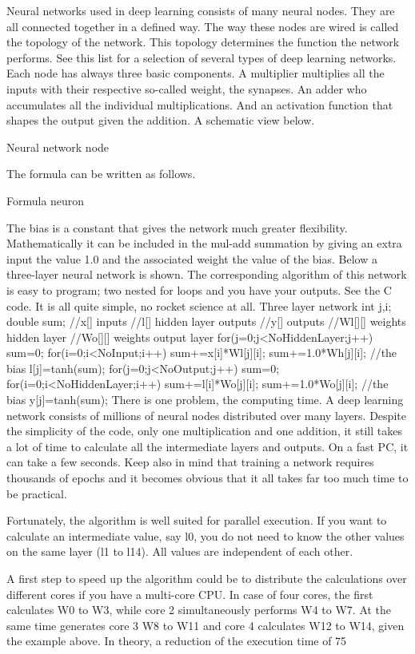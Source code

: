 Neural networks used in deep learning consists of many neural nodes. They are all connected together in a defined way. The way these nodes are wired is called the topology of the network. This topology determines the function the network performs. See this list for a selection of several types of deep learning networks.
Each node has always three basic components. A multiplier multiplies all the inputs with their respective so-called weight, the synapses. An adder who accumulates all the individual multiplications. And an activation function that shapes the output given the addition. A schematic view below.

Neural network node

The formula can be written as follows.

Formula neuron

The bias is a constant that gives the network much greater flexibility. Mathematically it can be included in the mul-add summation by giving an extra input the value 1.0 and the associated weight the value of the bias. Below a three-layer neural network is shown. The corresponding algorithm of this network is easy to program; two nested for loops and you have your outputs. See the C code. It is all quite simple, no rocket science at all.
Three layer network
int j,i;
double sum;
//x[] inputs
//l[] hidden layer outputs
//y[] outputs
//Wl[][] weights hidden layer
//Wo[][] weights output layer
for(j=0;j<NoHiddenLayer;j++){
sum=0;
for(i=0;i<NoInput;i++){
sum+=x[i]*Wl[j][i];
}
sum+=1.0*Wh[j][i]; //the bias
l[j]=tanh(sum);
}
for(j=0;j<NoOutput;j++){
sum=0;
for(i=0;i<NoHiddenLayer;i++){
sum+=l[i]*Wo[j][i];
}
sum+=1.0*Wo[j][i]; //the bias
y[j]=tanh(sum);
}
There is one problem, the computing time. A deep learning network consists of millions of neural nodes distributed over many layers. Despite the simplicity of the code, only one multiplication and one addition, it still takes a lot of time to calculate all the intermediate layers and outputs. On a fast PC, it can take a few seconds. Keep also in mind that training a network requires thousands of epochs and it becomes obvious that it all takes far too much time to be practical.
  
Fortunately, the algorithm is well suited for parallel execution. If you want to calculate an intermediate value, say l0, you do not need to know the other values on the same layer (l1 to l14). All values are independent of each other.

A first step to speed up the algorithm could be to distribute the calculations over different cores if you have a multi-core CPU. In case of four cores, the first calculates W0 to W3, while core 2 simultaneously performs W4 to W7. At the same time generates core 3 W8 to W11 and core 4 calculates W12 to W14, given the example above. In theory, a reduction of the execution time of 75%

